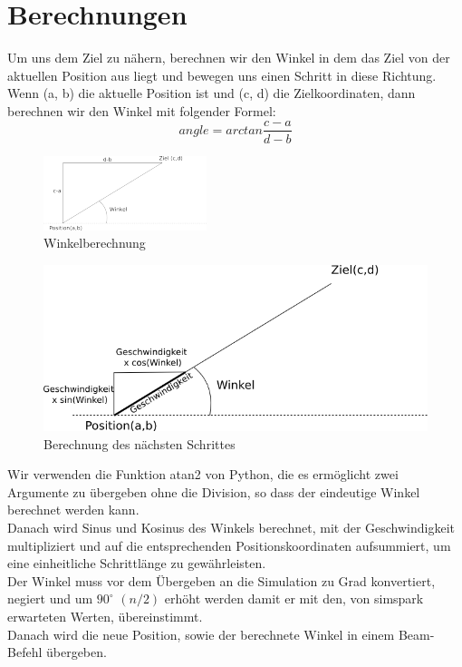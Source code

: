 \section*{Berechnungen}
Um uns dem Ziel zu nähern, berechnen wir den Winkel in dem das Ziel von 
der aktuellen Position aus liegt und bewegen uns einen Schritt in diese 
Richtung. \\   
Wenn (a, b) die aktuelle Position ist und (c, d) die Zielkoordinaten, dann berechnen wir den Winkel mit folgender Formel:\\
\begin{equation}
angle = arctan \frac{c - a}{d -b}
\end{equation}
\begin{figure}
\begin{center}
\includegraphics[scale=1]{180px-Winkel}
\end{center}
\caption{Winkelberechnung}
\end{figure}
\begin{figure}
\begin{center}
\includegraphics[scale=0.6]{geschwindigkeit}
\end{center}
\caption{Berechnung des nächsten Schrittes}
\end{figure}
Wir verwenden die Funktion atan2 von Python, die es ermöglicht 
zwei Argumente zu übergeben ohne die Division, so dass der eindeutige 
Winkel berechnet werden kann.\\
Danach wird Sinus und Kosinus des Winkels berechnet, mit der 
Geschwindigkeit multipliziert und auf die entsprechenden 
Positionskoordinaten aufsummiert, um eine einheitliche Schrittlänge zu 
gewährleisten.\\
Der Winkel muss vor dem Übergeben an die Simulation zu Grad 
konvertiert, negiert und um $90^\circ$ $(n/2)$ erhöht werden damit er mit den, 
von simspark erwarteten Werten, übereinstimmt.\\
Danach wird die neue Position, sowie der berechnete Winkel in einem Beam-Befehl übergeben.

